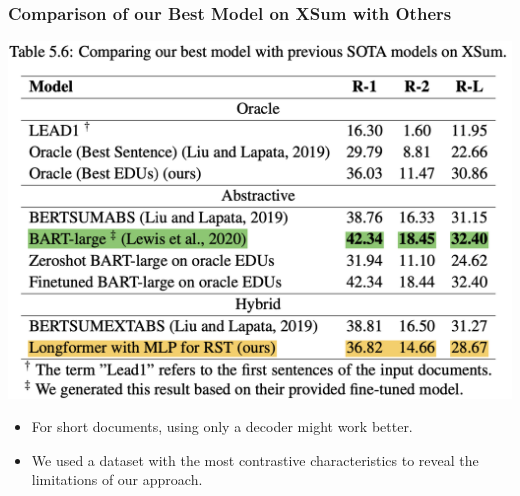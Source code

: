 \documentclass{beamer}
\begin{document}
\begin{frame}
\frametitle{Comparison of our Best Model on XSum with Others}

   \begin{minipage}[t][0.5\textheight][t]{\textwidth}
      \centering
      \includegraphics[scale=.3]{imgs/table56_highlight.png} 
  \end{minipage}

  \vfill

  \begin{minipage}[t][0.5\textheight][t]{\textwidth}
    \begin{itemize}
       \item For short documents, using only a decoder might work better.
      \item We used a dataset with the most contrastive characteristics to reveal the limitations of our approach.
    \end{itemize}
  \end{minipage}
 
\end{frame}
\end{document}

